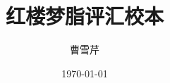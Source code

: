 \documentclass[a4paper,12pt]{ctexbook}
\begin{document}
	\author{曹雪芹}
	\title{红楼梦脂评汇校本}
	\date{\today}
	\maketitle
	\frontmatter
	
	
		
    \mainmatter
\tableofcontents

%
%
%
%
%
%
%
%
%
%
%
%
%
%
%
%
%
%
%
%
%
%
%
%
%
%
%
%
%
%
%
%
%
%
%
%
%
%
%
%
%
%
%
%
%
%
%
%
%
%
%
%
%
%
%
%
%
%
%
%
%
%
%
%
%
%
%
%
%
%
%
%
%
%
%
%
%
%
%

%
%
%
%
%
%
\end{document}
